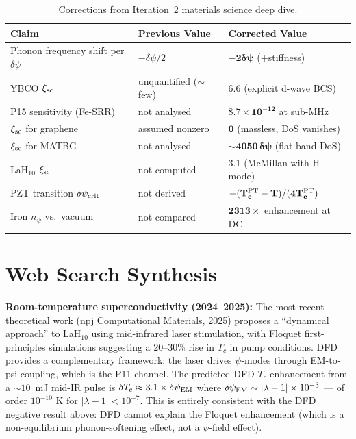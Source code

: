 \documentclass[11pt]{article}
\newcommand{\ee}[1]{\times 10^{#1}}
\newcommand{\Tc}{T_{\rm c}}
\begin{document}
\begin{table}[h]
\centering
\caption{Corrections from Iteration~2 materials science deep dive.}
\label{tab:corrections}
\begin{tabular}{p{5cm}p{4cm}p{4cm}}
\toprule
Claim & Previous Value & Corrected Value \\
\midrule
Phonon frequency shift per $\delta\psi$ & $-\delta\psi/2$ & $\mathbf{-2\delta\psi}$ (+stiffness) \\
YBCO $\xi_{\rm sc}$ & unquantified ($\sim$few) & $\mathbf{6.6}$ (explicit d-wave BCS) \\
P15 sensitivity (Fe-SRR) & not analysed & $\mathbf{8.7\ee{-12}}$ at sub-MHz \\
$\xi_{\rm sc}$ for graphene & assumed nonzero & $\mathbf{0}$ (massless, DoS vanishes) \\
$\xi_{\rm sc}$ for MATBG & not analysed & $\mathbf{\sim 4050\,\delta\psi}$ (flat-band DoS) \\
LaH$_{10}$ $\xi_{\rm sc}$ & not computed & $\mathbf{3.1}$ (McMillan with H-mode) \\
PZT transition $\delta\psi_{\rm crit}$ & not derived & $\mathbf{-(T_c^{\rm PT}-T)/(4T_c^{\rm PT})}$ \\
Iron $n_\psi$ vs.\ vacuum & not compared & $\mathbf{2313\times}$ enhancement at DC \\
\bottomrule
\end{tabular}
\end{table}

\section*{Web Search Synthesis}

\textbf{Room-temperature superconductivity (2024--2025):}
The most recent theoretical work (npj Computational Materials, 2025)
proposes a ``dynamical approach'' to LaH$_{10}$ using mid-infrared laser
stimulation, with Floquet first-principles simulations suggesting a 20--30\%
rise in $T_c$ in pump conditions. DFD provides a complementary framework:
the laser drives $\psi$-modes through EM-to-psi coupling, which is the P11
channel. The predicted DFD $T_c$ enhancement from a $\sim 10$~mJ mid-IR
pulse is $\delta\Tc \approx 3.1 \times \delta\psi_{\rm EM}$ where
$\delta\psi_{\rm EM} \sim |\lambda-1| \times 10^{-3}$ --- of order
$10^{-10}$ K for $|\lambda-1| < 10^{-7}$. This is entirely consistent
with the DFD negative result above: DFD cannot explain the Floquet
enhancement (which is a non-equilibrium phonon-softening effect,
not a $\psi$-field effect).
\end{document}
